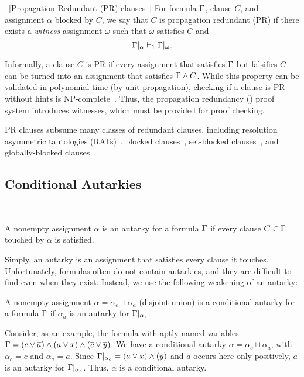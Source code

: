 \begin{definition}~\label{def:pr}[Propagation Redundant (PR)
    clauses~\cite{prclauses}] For formula $\Gamma$, clause $C$, and assignment
    $\alpha$ blocked by $C$, we say that $C$ is propagation redundant (PR) if
    there exists a \emph{witness} assignment $\omega$ such that $\omega$
    satisfies $C$ and
$$
    \Gamma|_\alpha \vdash_1 \Gamma|_\omega.
$$
\end{definition}


Informally, a clause $C$ is PR if every assignment that satisfies $\Gamma$ but
falsifies $C$ can be turned into an assignment that satisfies $\Gamma \land
C$. While this property can be validated in polynomial time (by unit
propagation), checking if a clause is PR without hints is
NP-complete~\cite{prclauses}. Thus, the propagation redundancy (\pr) proof
system introduces witnesses, which must be provided for proof checking.  


PR clauses subsume many classes of redundant clauses, including resolution
asymmetric tautologies (RATs)~\cite{rat}, blocked clauses~\cite{blockedclause},
set-blocked clauses~\cite{setblocked}, and globally-blocked
clauses~\cite{conditionalautarkies}.

\subsection{Conditional Autarkies}~\label{subsec:autarkies}

\begin{definition}
    A nonempty assignment $\alpha$ is an autarky for a formula $\Gamma$ if
    every clause $C \in \Gamma$ touched by $\alpha$ is satisfied.
\end{definition}

Simply, an autarky is an assignment that satisfies every clause it touches.
Unfortunately, formulas often do not contain autarkies, and they are difficult
to find even when they exist. Instead, we use the following weakening of an
autarky:

\begin{definition}
    A nonempty assignment $\alpha = \alpha_c \sqcup \alpha_a$ (disjoint union)
    is a conditional autarky for a formula $\Gamma$ if $\alpha_a$ is an
    autarky for $\Gamma|_{\alpha_c}$.
\end{definition}

Consider, as an example, the formula with aptly named variables $\Gamma = (c
\lor \overline{a}) \land (a \lor x) \land (\overline{c} \lor \overline{y})$. We
have a conditional autarky $\alpha = \alpha_c \sqcup \alpha_a$, with $\alpha_c =
c$ and $\alpha_a = a$. Since $\Gamma|_{\alpha_c} = (a \lor x) \land
(\overline{y})$ and $a$ occurs here only positively, $a$ is an autarky for
$\Gamma|_{\alpha_c}$. Thus, $\alpha$ is a conditional autarky.

